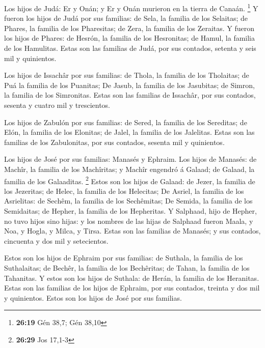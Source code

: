  Los hijos de Judá: Er y Onán; y Er y Onán murieron en la
tierra de Canaán. \footnote{\textbf{26:19} Gén 38,7; Gén 38,10}
 Y fueron los hijos de Judá por sus familias: de Sela, la
familia de los Selaitas; de Phares, la familia de los Pharesitas; de
Zera, la familia de los Zeraitas.  Y fueron los hijos de
Phares: de Hesrón, la familia de los Hesronitas; de Hamul, la familia de
los Hamulitas.  Estas son las familias de Judá, por sus
contados, setenta y seis mil y quinientos.

 Los hijos de Issachâr por sus familias: de Thola, la
familia de los Tholaitas; de Puá la familia de los Puanitas;
 De Jasub, la familia de los Jasubitas; de Simron, la
familia de los Simronitas.  Estas son las familias de
Issachâr, por sus contados, sesenta y cuatro mil y trescientos.

 Los hijos de Zabulón por sus familias: de Sered, la
familia de los Sereditas; de Elón, la familia de los Elonitas; de Jalel,
la familia de los Jalelitas.  Estas son las familias de
los Zabulonitas, por sus contados, sesenta mil y quinientos.

 Los hijos de José por sus familias: Manasés y Ephraim.
 Los hijos de Manasés: de Machîr, la familia de los
Machîritas; y Machîr engendró á Galaad; de Galaad, la familia de los
Galaaditas. \footnote{\textbf{26:29} Jos 17,1-3}  Estos
son los hijos de Galaad: de Jezer, la familia de los Jezeritas; de
Helec, la familia de los Helecitas;  De Asriel, la
familia de los Asrielitas: de Sechêm, la familia de los Sechêmitas;
 De Semida, la familia de los Semidaitas; de Hepher, la
familia de los Hepheritas.  Y Salphaad, hijo de Hepher,
no tuvo hijos sino hijas: y los nombres de las hijas de Salphaad fueron
Maala, y Noa, y Hogla, y Milca, y Tirsa.  Estas son las
familias de Manasés; y sus contados, cincuenta y dos mil y setecientos.

 Estos son los hijos de Ephraim por sus familias: de
Suthala, la familia de los Suthalaitas; de Bechêr, la familia de los
Bechêritas; de Tahan, la familia de los Tahanitas.  Y
estos son los hijos de Suthala: de Herán, la familia de los Heranitas.
 Estas son las familias de los hijos de Ephraim, por sus
contados, treinta y dos mil y quinientos. Estos son los hijos de José
por sus familias.

